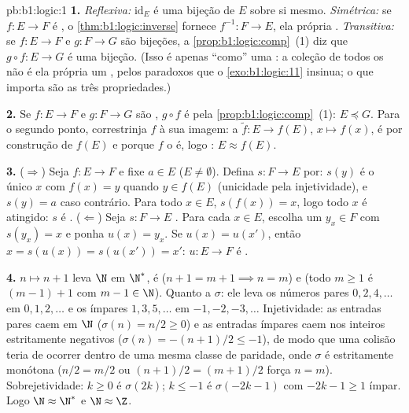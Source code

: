 \begin{solution}{pb:b1:logic:1}
\textbf{1.} \emph{Reflexiva:} $\mathrm{id}_E$ é uma bijeção de $E$
sobre si mesmo. \emph{Simétrica:} se $f \colon E \to F$ é , o
\cref{thm:b1:logic:inverse} fornece $f^{-1} \colon F \to E$, ela própria
. \emph{Transitiva:} se $f \colon E \to F$ e $g \colon F
\to G$ são bijeções, a \cref{prop:b1:logic:comp}~(1) diz que $g \circ f
\colon E \to G$ é uma bijeção. (Isso é apenas ``como'' uma : a coleção de todos os  não é ela própria um
, pelos paradoxos que o \cref{exo:b1:logic:11} insinua; o que importa
são as três propriedades.)

\textbf{2.} Se $f \colon E \to F$ e $g \colon F \to G$ são
, $g \circ f$ é  pela \cref{prop:b1:logic:comp}~(1):
$E \preceq G$. Para o segundo ponto, correstrinja $f$ à sua imagem: a
 $\tilde f \colon E \to f(E)$, $x \mapsto f(x)$, é  por
construção de $f(E)$ e  porque $f$ o é, logo :
$E \approx f(E)$.

\textbf{3.} ($\Rightarrow$) Seja $f \colon E \to F$  e
fixe $a \in E$ ($E \neq \emptyset$). Defina $s \colon F \to E$ por:
$s(y)$ é o único $x$ com $f(x) = y$ quando $y \in f(E)$
(unicidade pela injetividade), e $s(y) = a$ caso contrário. Para todo $x
\in E$, $s(f(x)) = x$, logo todo $x$ é atingido: $s$ é .
($\Leftarrow$) Seja $s \colon F \to E$ . Para cada $x \in
E$, escolha um $y_x \in F$ com $s(y_x) = x$ e ponha $u(x) = y_x$. Se
$u(x) = u(x')$, então $x = s(u(x)) = s(u(x')) = x'$: $u \colon E \to F$
é .

\textbf{4.} $n \mapsto n + 1$ leva $\N$ em $\N^*$, é 
($n + 1 = m + 1 \implies n = m$) e  (todo $m \geq 1$ é
$(m - 1) + 1$ com $m - 1 \in \N$). Quanto a $\sigma$: ele leva os números
pares $0, 2, 4, \dots$ em $0, 1, 2, \dots$ e os ímpares $1, 3,
5, \dots$ em $-1, -2, -3, \dots$ Injetividade: as entradas pares caem em
$\N$ ($\sigma(n) = n/2 \geq 0$) e as entradas ímpares caem nos inteiros
estritamente negativos ($\sigma(n) = -(n+1)/2 \leq -1$), de modo que uma
colisão teria de ocorrer dentro de uma mesma classe de paridade, onde
$\sigma$ é estritamente monótona ($n/2 = m/2$ ou $(n+1)/2 = (m+1)/2$ força $n =
m$). Sobrejetividade: $k \geq 0$ é $\sigma(2k)$; $k \leq -1$ é
$\sigma(-2k - 1)$ com $-2k - 1 \geq 1$ ímpar. Logo $\N \approx \N^*$ e
$\N \approx \Z$.


\end{solution}
